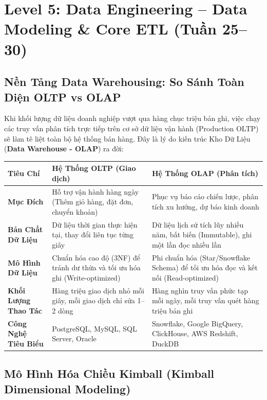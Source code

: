 \chapter{Level 5: Data Engineering -- Data Modeling \& Core ETL (Tuần 25--30)}

\section{Nền Tảng Data Warehousing: So Sánh Toàn Diện OLTP vs OLAP}

Khi khối lượng dữ liệu doanh nghiệp vượt qua hàng chục triệu bản ghi, việc chạy các truy vấn phân tích trực tiếp trên cơ sở dữ liệu vận hành (Production OLTP) sẽ làm tê liệt toàn bộ hệ thống bán hàng. Đây là lý do kiến trúc Kho Dữ Liệu (\textbf{Data Warehouse - OLAP}) ra đời:

\begin{center}
\begin{tabular}{|l|p{6cm}|p{6cm}|}
\hline
\textbf{Tiêu Chí} & \textbf{Hệ Thống OLTP (Giao dịch)} & \textbf{Hệ Thống OLAP (Phân tích)} \\
\hline
\textbf{Mục Đích} & Hỗ trợ vận hành hàng ngày (Thêm giỏ hàng, đặt đơn, chuyển khoản) & Phục vụ báo cáo chiến lược, phân tích xu hướng, dự báo kinh doanh \\
\hline
\textbf{Bản Chất Dữ Liệu} & Dữ liệu thời gian thực hiện tại, thay đổi liên tục từng giây & Dữ liệu lịch sử tích lũy nhiều năm, bất biến (Immutable), ghi một lần đọc nhiều lần \\
\hline
\textbf{Mô Hình Dữ Liệu} & Chuẩn hóa cao độ (3NF) để tránh dư thừa và tối ưu hóa ghi (Write-optimized) & Phi chuẩn hóa (Star/Snowflake Schema) để tối ưu hóa đọc và kết nối (Read-optimized) \\
\hline
\textbf{Khối Lượng Thao Tác} & Hàng triệu giao dịch nhỏ mỗi giây, mỗi giao dịch chỉ sửa 1--2 dòng & Hàng nghìn truy vấn phức tạp mỗi ngày, mỗi truy vấn quét hàng triệu bản ghi \\
\hline
\textbf{Công Nghệ Tiêu Biểu} & PostgreSQL, MySQL, SQL Server, Oracle & Snowflake, Google BigQuery, ClickHouse, AWS Redshift, DuckDB \\
\hline
\end{tabular}
\end{center}

\section{Mô Hình Hóa Chiều Kimball (Kimball Dimensional Modeling)}

